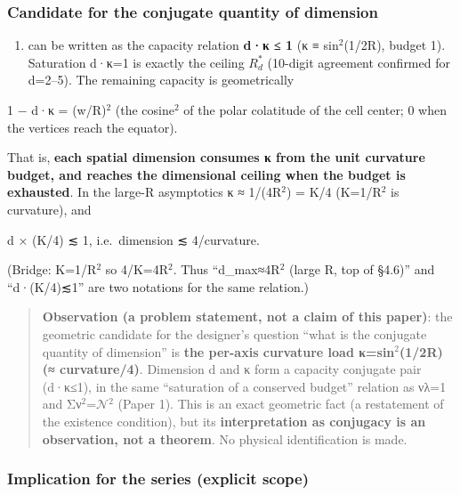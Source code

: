 \documentclass[
]{ltjsarticle}
\providecommand{\tightlist}{%
  \setlength{\itemsep}{0pt}\setlength{\parskip}{0pt}}
\begin{document}
\subsubsection{Candidate for the conjugate quantity of
dimension}\label{candidate-for-the-conjugate-quantity-of-dimension}

\begin{enumerate}
\def\labelenumi{(\arabic{enumi})}
\setcounter{enumi}{9}
\tightlist
\item
  can be written as the capacity relation \textbf{d·κ ≤ 1} (κ ≡
  sin\(^{2}\)(1/2R), budget 1). Saturation d·κ=1 is exactly the ceiling
  \(R^{*}_{d}\) (10-digit agreement confirmed for d=2--5). The remaining
  capacity is geometrically
\end{enumerate}

1 − d·κ = (w/R)\(^{2}\) (the cosine\(^{2}\) of the polar colatitude of
the cell center; 0 when the vertices reach the equator).

That is, \textbf{each spatial dimension consumes κ from the unit
curvature budget, and reaches the dimensional ceiling when the budget is
exhausted}. In the large-R asymptotics κ ≈ 1/(4R\(^{2}\)) = K/4
(K=1/R\(^{2}\) is curvature), and

d × (K/4) ≲ 1, i.e.~dimension ≲ 4/curvature.

(Bridge: K=1/R\(^{2}\) so 4/K=4R\(^{2}\). Thus ``d\_max≈4R\(^{2}\)
(large R, top of §4.6)'' and ``d·(K/4)≲1'' are two notations for the
same relation.)

\begin{quote}
\textbf{Observation (a problem statement, not a claim of this paper)}:
the geometric candidate for the designer's question ``what is the
conjugate quantity of dimension'' is \textbf{the per-axis curvature load
κ=sin\(^{2}\)(1/2R) (≈ curvature/4)}. Dimension d and κ form a capacity
conjugate pair (d·κ≤1), in the same ``saturation of a conserved budget''
relation as νλ=1 and Σν\(^{2}\)=\(\mathcal{N}\)\(^{2}\) (Paper 1). This
is an exact geometric fact (a restatement of the existence condition),
but its \textbf{interpretation as conjugacy is an observation, not a
theorem}. No physical identification is made.
\end{quote}

\subsubsection{Implication for the series (explicit
scope)}\label{implication-for-the-series-explicit-scope}
\end{document}

